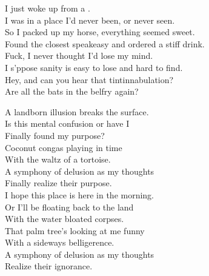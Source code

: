 
\label{album:phantom-island}





I just woke up from a . \\
I was in a place I'd never been, or never seen. \\
So I packed up my horse, everything seemed sweet. \\
Found the closest speakeasy and ordered a stiff drink. \\

Fuck, I never thought I'd lose my mind. \\
I s'ppose sanity is easy to lose and hard to find. \\
Hey, and can you hear that tintinnabulation? \\
Are all the bats in the belfry again? \\


A landborn illusion breaks the  surface. \\
Is this mental confusion or have I \\
Finally found my purpose? \\
Coconut congas playing in time \\
With the waltz of a tortoise. \\
A symphony of delusion as my thoughts \\
Finally realize their purpose. \\

I hope this place is here in the morning. \\
Or I'll be floating back to the land \\
With the water bloated corpses. \\
That palm tree's looking at me funny \\
With a sideways belligerence. \\
A symphony of delusion as my thoughts \\
Realize their ignorance. \\


